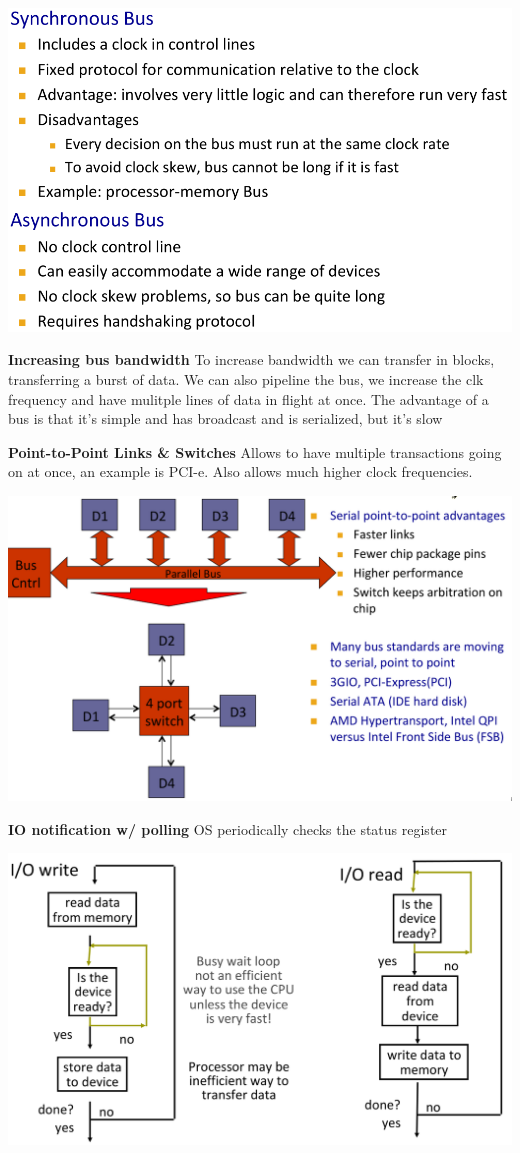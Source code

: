 \includegraphics[width=\linewidth]{png/bus_sync.png}

\textbf{Increasing bus bandwidth} To increase bandwidth we can transfer in blocks,
transferring a burst of data. We can also pipeline the bus, we increase the clk
frequency and have mulitple lines of data in flight at once. The advantage of a
bus is that it's simple and has broadcast and is serialized, but it's slow

\textbf{Point-to-Point Links \& Switches} Allows to have multiple transactions
going on at once, an example is PCI-e. Also allows much higher clock frequencies.

\includegraphics[width=\linewidth]{png/ptplink.png}

\textbf{IO notification w/ polling} OS periodically checks the status register

\includegraphics[width=\linewidth]{png/polling.png}

